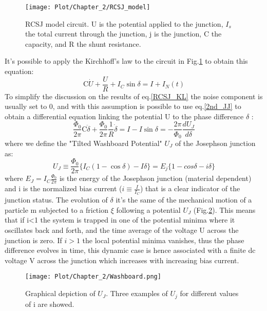 \documentclass[12pt,a4paper]{report}
\begin{document}
    \begin{figure} [H]
    	\centering
    	\texttt{[image: Plot/Chapter\_2/RCSJ\_model]}
    	\caption{\small{RCSJ model circuit. U is the potential applied to the junction, $I_s$ the total current through the junction, j is the junction, C the capacity, and R the shunt resistance.}}
    	\label{RCSJ}
    \end{figure}
    It's possible to apply the Kirchhoff's law to the circuit in Fig.\ref{RCSJ} to obtain this equation:
    \begin{equation}
    	\text{C}\dot{U} + \frac{U}{R} + I_C \sin\delta = I + I_N(t)
    	\label{RCSJ_KL}
    \end{equation}
    To simplify the discussion on the results of eq.\ref{RCSJ_KL} the noise component is usually set to 0, and with this assumption is possible to use eq.\ref{2nd_JJ} to obtain a differential equation linking the potential U to the phase difference $\delta$ \cite{Squid_handbook_1}:
    \begin{equation}
    	\frac{\Phi_0}{2\pi}\text{C}\ddot{\delta} + \frac{\Phi_0}{2\pi} \frac{1}{R} \dot{\delta} =I - I\sin\delta = -\frac{2\pi}{\Phi_0}\frac{dU_J}{d\delta}
    	\label{RCSJ_time_law}
    \end{equation}
    where we define the "Tilted Washboard Potential" $U_J$ of the Josephson junction as:
    \begin{equation}
    	U_J \equiv \frac{\Phi_0}{2\pi}\{ I_C(1-\cos\delta) - I\delta \} = E_j\{1-cos\delta-i\delta\}
    \end{equation}
    where $E_J= I_C  \frac{\Phi_0}{2\pi}$ is the energy of the Josephson junction (material dependent) and i is the normalized bias current ($i\equiv\frac{I}{I_C}$) that is a clear indicator of the junction status.
    The evolution of $\delta$ it's the same of the mechanical motion of a particle m subjected to a friction $\xi$ following a potential $U_J$ (Fig.\ref{washboard}). This means that if i<1 the system is trapped in one of the potential minima where it oscillates back and forth, and the time average of the voltage U across the junction is zero. If $i>1$ the local potential minima vanishes, thus the phase difference evolves in time, this dynamic case is hence associated with a finite dc voltage V across the junction which increases with increasing bias current.
    \begin{figure} [H]
    	\centering
    	\texttt{[image: Plot/Chapter\_2/Washboard.png]}
    	\caption{\small{Graphical depiction of $U_J$. Three examples of $U_j$ for different values of i are showed. }}
    	\label{washboard}
    \end{figure}
\end{document}

